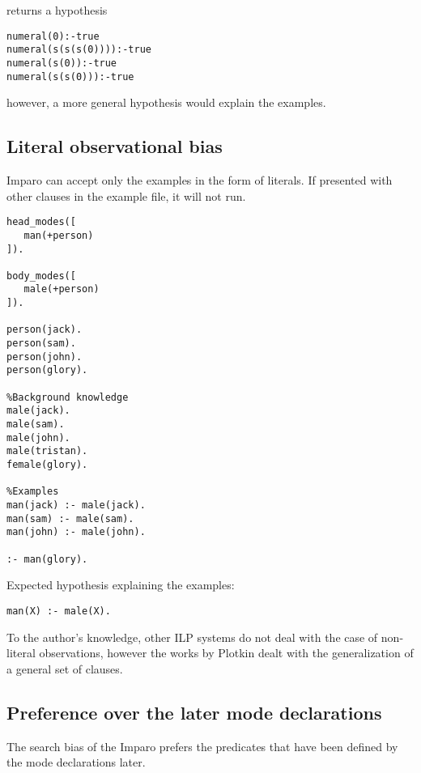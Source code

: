 returns a hypothesis

\begin{lstlisting}
numeral(0):-true
numeral(s(s(s(0)))):-true
numeral(s(0)):-true
numeral(s(s(0))):-true
\end{lstlisting}

however, a more general hypothesis  would explain the examples.

\subsection{Literal observational bias}
Imparo can accept only the examples in the form of literals. If presented with other clauses in the example file, it will not run.

\begin{lstlisting}
head_modes([
   man(+person)
]).

body_modes([
   male(+person)
]).

person(jack).
person(sam).
person(john).
person(glory).

%Background knowledge
male(jack).
male(sam).
male(john).
male(tristan).
female(glory).

%Examples
man(jack) :- male(jack).
man(sam) :- male(sam).
man(john) :- male(john).

:- man(glory).
\end{lstlisting}

Expected hypothesis explaining the examples:

\begin{lstlisting}
man(X) :- male(X).
\end{lstlisting}

To the author's knowledge, other ILP systems do not deal with the case of non-literal observations, however the works by Plotkin dealt with the generalization of a general set of clauses.

\subsection{Preference over the later mode declarations}
The search bias of the Imparo prefers the predicates that have been defined by the mode declarations later.

